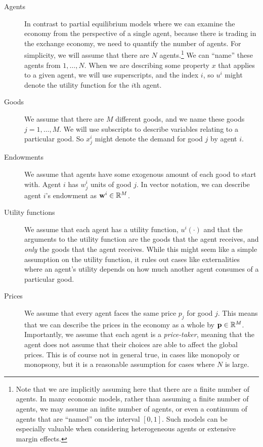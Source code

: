 \begin{description}
    \item[Agents] In contrast to partial equilibrium models where we can examine the economy from the perspective of a single agent, because there is trading in the exchange economy, we need to quantify the number of agents. For simplicity, we will assume that there are $N$ agents.\footnote{
        Note that we are implicitly assuming here that there are a finite number of agents. In many economic models, rather than assuming a finite number of agents, we may assume an infite number of agents, or even a continuum of agents that are ``named'' on the interval $[0, 1]$. Such models can be especially valuable when considering heterogeneous agents or extensive margin effects. 
    } We can ``name'' these agents from $1, \dots, N$. When we are describing some property $x$ that applies to a given agent, we will use superscripts, and the index $i$, so $u^i$ might denote the utility function for the $i$th agent. 
    \item[Goods] We assume that there are $M$ different goods, and we name these goods $j = 1, \dots, M$. We will use subscripts to describe variables relating to a particular good. So $x^i_j$ might denote the demand for good $j$ by agent $i$. 
    \item[Endowments] We assume that agents have some exogenous amount of each good to start with. Agent $i$ has $w^i_j$ units of good $j$. In vector notation, we can describe agent $i$'s endowment as $\mathbf{w}^i \in \mathbb{R}^M$. 
    \item[Utility functions] We assume that each agent has a utility function, $u^i(\cdot)$ and that the arguments to the utility function are the goods that the agent receives, and \emph{only} the goods that the agent receives. While this might seem like a simple assumption on the utility function, it rules out cases like externalities where an agent's utility depends on how much another agent consumes of a particular good. 
    \item[Prices] We assume that every agent faces the same price $p_j$ for good $j$. This means that we can describe the prices in the economy as a whole by $\mathbf{p} \in \mathbb{R}^M$. Importantly, we assume that each agent is a \emph{price-taker}, meaning that the agent does not assume that their choices are able to affect the global prices. This is of course not in general true, in cases like monopoly or monopsony, but it is a reasonable assumption for cases where $N$ is large.     
\end{description}

